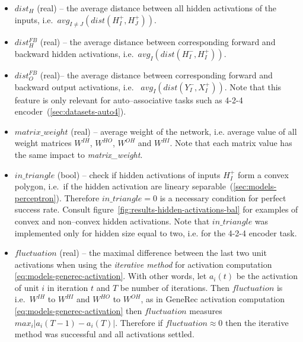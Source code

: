 \begin{itemize} 
\label{sec:our-h-dist} 
\item $dist_{H}$ (real) -- the average distance between all hidden activations of the inputs, i.e.~$avg_{I \neq J}\left(dist(H_I^{+},H_J^{+})\right)$. %

\label{sec:our-dist-h-fb}
\item $dist_{H}^{FB}$ (real) -- the average distance between corresponding forward and backward hidden activations, i.e.~$avg_{I}\left(dist(H_I^{-},H_I^{+})\right)$.

\label{sec:our-dist-o-fb}
\item	$dist_{O}^{FB}$ (real)-- the average distance between corresponding forward and backward output activations, i.e.~  $avg_{I}\left(dist(Y_I^{-},X_I^{+})\right)$. Note that this feature is only relevant for auto--associative tasks such as 4-2-4 encoder~(\ref{sec:datasets-auto4}). 

\label{sec:our-m-wei}
\item $matrix\_weight$ (real) -- average weight of the network, i.e. average value of all weight matrices $W^{IH}$, $W^{HO}$, $W^{OH}$ and $W^{HI}$. Note that each matrix value has the same impact to \emph{matrix\_weight}. 


\label{sec:our-in-triangle}
\item $in\_triangle$ (bool) -- check if hidden activations of inputs  $H_I^{+}$ form a convex polygon, i.e.~if the hidden activation are lineary separable~(\ref{sec:models-perceptron}). Therefore $in\_triangle=0$ is a necessary condition for perfect success rate. Consult figure~\ref{fig:results-hidden-activations-bal} for examples of convex and non--convex hidden activations. Note that $in\_triangle$ was implemented only for hidden size equal to two, i.e. for the 4-2-4 encoder task. 

\label{sec:our-fluctuation}
\item $fluctuation$ (real) -- the maximal difference between the last two unit activations when using the \emph{iterative method} for activation computation \ref{eq:models-generec-activation}. With other words, let $a_i(t)$ be the activation of unit $i$ in iteration $t$ and $T$ be number of iterations. Then $fluctuation$ is i.e.~$W^{IH}$ to $W^{HI}$ and $W^{HO}$ to $W^{OH}$, as in GeneRec activation computation \ref{eq:models-generec-activation} then $fluctuation$ measures $max_i|a_i(T-1) - a_i(T)|$. Therefore if $fluctuation \approx 0$ then the iterative method was successful and all activations settled.
\end{itemize} 

